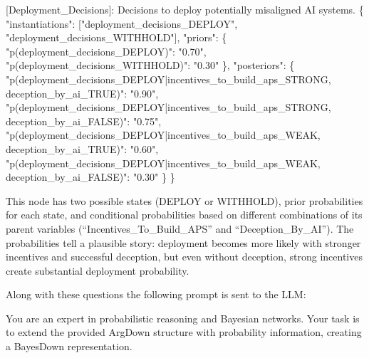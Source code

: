 \documentclass[
  11pt,
  letterpaper,
]{book}
\newenvironment{Shaded}{\begin{snugshade}}{\end{snugshade}}
\newcommand{\DataTypeTok}[1]{\textcolor[rgb]{0.68,0.00,0.00}{#1}}
\newcommand{\ErrorTok}[1]{\textcolor[rgb]{0.68,0.00,0.00}{#1}}
\newcommand{\FunctionTok}[1]{\textcolor[rgb]{0.28,0.35,0.67}{#1}}
\newcommand{\OtherTok}[1]{\textcolor[rgb]{0.00,0.23,0.31}{#1}}
\newcommand{\StringTok}[1]{\textcolor[rgb]{0.13,0.47,0.30}{#1}}
\begin{document}
\begin{landscape}
\begin{Shaded}
\begin{Highlighting}[]
\OtherTok{[}\ErrorTok{Deployment\_Decisions}\OtherTok{]}\ErrorTok{:} \ErrorTok{Decisions} \ErrorTok{to} \ErrorTok{deploy} \ErrorTok{potentially} \ErrorTok{misaligned} \ErrorTok{AI} \ErrorTok{systems.} \FunctionTok{\{}
  \DataTypeTok{"instantiations"}\FunctionTok{:} \OtherTok{[}\StringTok{"deployment\_decisions\_DEPLOY"}\OtherTok{,} \StringTok{"deployment\_decisions\_WITHHOLD"}\OtherTok{]}\FunctionTok{,}
  \DataTypeTok{"priors"}\FunctionTok{:} \FunctionTok{\{}
    \DataTypeTok{"p(deployment\_decisions\_DEPLOY)"}\FunctionTok{:} \StringTok{"0.70"}\FunctionTok{,}
    \DataTypeTok{"p(deployment\_decisions\_WITHHOLD)"}\FunctionTok{:} \StringTok{"0.30"}
  \FunctionTok{\},}
  \DataTypeTok{"posteriors"}\FunctionTok{:} \FunctionTok{\{}
    \DataTypeTok{"p(deployment\_decisions\_DEPLOY|incentives\_to\_build\_aps\_STRONG, deception\_by\_ai\_TRUE)"}\FunctionTok{:} \StringTok{"0.90"}\FunctionTok{,}
    \DataTypeTok{"p(deployment\_decisions\_DEPLOY|incentives\_to\_build\_aps\_STRONG, deception\_by\_ai\_FALSE)"}\FunctionTok{:} \StringTok{"0.75"}\FunctionTok{,}
    \DataTypeTok{"p(deployment\_decisions\_DEPLOY|incentives\_to\_build\_aps\_WEAK, deception\_by\_ai\_TRUE)"}\FunctionTok{:} \StringTok{"0.60"}\FunctionTok{,}
    \DataTypeTok{"p(deployment\_decisions\_DEPLOY|incentives\_to\_build\_aps\_WEAK, deception\_by\_ai\_FALSE)"}\FunctionTok{:} \StringTok{"0.30"}
  \FunctionTok{\}}
\FunctionTok{\}}
\end{Highlighting}
\end{Shaded}

This node has two possible states (DEPLOY or WITHHOLD), prior
probabilities for each state, and conditional probabilities based on
different combinations of its parent variables
(``Incentives\_To\_Build\_APS'' and ``Deception\_By\_AI''). The
probabilities tell a plausible story: deployment becomes more likely
with stronger incentives and successful deception, but even without
deception, strong incentives create substantial deployment probability.

Along with these questions the following prompt is sent to the LLM:

\begin{Shaded}
\begin{Highlighting}[]

\ErrorTok{You} \ErrorTok{are} \ErrorTok{an} \ErrorTok{expert} \ErrorTok{in} \ErrorTok{probabilistic} \ErrorTok{reasoning} \ErrorTok{and} \ErrorTok{Bayesian} \ErrorTok{networks.} \ErrorTok{Your} \ErrorTok{task} \ErrorTok{is}
\ErrorTok{to} \ErrorTok{extend} \ErrorTok{the} \ErrorTok{provided} \ErrorTok{ArgDown} \ErrorTok{structure} \ErrorTok{with} \ErrorTok{probability} \ErrorTok{information,}
\ErrorTok{creating} \ErrorTok{a} \ErrorTok{BayesDown} \ErrorTok{representation.}


\end{Highlighting}
\end{Shaded}
\end{landscape}
\end{document}
